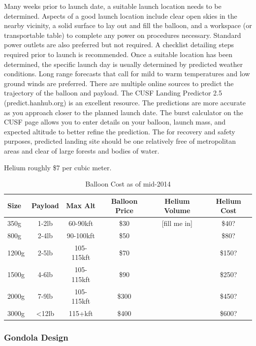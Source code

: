 \documentclass[heading.tex]{subfiles}
\begin{document}
Many weeks prior to launch date, a suitable launch location needs to be determined.
Aspects of a good launch location include clear open skies in the nearby vicinity,
a solid surface to lay out and fill the balloon, and a workspace (or transportable table)
to complete any power on procedures necessary.
Standard power outlets are also preferred but not required.
A checklist detailing steps required prior to launch is recommended.
Once a suitable location has been determined, the specific launch day
is usually determined by predicted weather conditions.
Long range forecasts that call for mild to warm temperatures and low ground winds are preferred.
There are multiple online sources to predict the trajectory of the balloon and payload.
The CUSF Landing Predictor 2.5 (predict.hanhub.org) is an excellent resource.
The predictions are more accurate as you approach closer to the planned launch date.
The burst calculator on the CUSF page allows you to enter details on your balloon,
launch mass, and expected altitude to better refine the prediction.
The for recovery and safety purposes, predicted landing site should be one relatively
free of metropolitan areas and clear of large forests and bodies of water. 


Helium roughly \$7 per cubic meter.

\begin{table}[h]
    \centering
    \caption{Balloon Cost as of mid-2014}
    \label{tab:desvars}
    \begin{tabular}{l  c  c  c  c  c} 
        \hline \hline
        Size &  Payload & Max Alt & Balloon Price & Helium Volume &Helium Cost\\ \hline \hline
        350g & 1-2lb & 60-90kft & \$30 & [fill me in] & \$40? \\ 
        800g & 2-4lb & 90-100kft & \$50 & & \$80? \\ 
        1200g & 2-5lb & 105-115kft & \$70 & & \$150? \\ 
        1500g & 4-6lb & 105-115kft & \$90 & & \$250?\\
        2000g & 7-9lb & 105-115kft & \$300 & & \$450?\\ 
        3000g & \textless 12lb & 115+kft & \$400 & & \$600?\\ \hline
    \end{tabular}
\end{table}


\subsubsection{Gondola Design}
\end{document}
